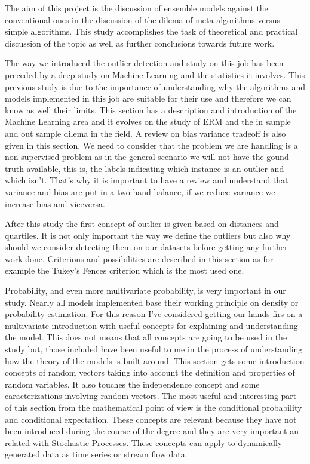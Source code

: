 The aim of this project is the discussion of ensemble models against the conventional ones in the discussion of the dilema of meta-algorithms versus simple algorithms. This study accomplishes the task of theoretical and practical discussion of the topic as well as further conclusions towards future work.

The way we introduced the outlier detection and study on this job has been preceded by a deep study on Machine Learning and the statistics it involves. This previous study is due to the importance of understanding why the algorithms and models implemented in this job are suitable for their use and therefore we can know as well their limits. This section has a description and introduction of the Machine Learning area and it evolves on the study of ERM and the in sample and out sample dilema in the field. A review on bias variance tradeoff is also given in this section. We need to consider that the problem we are handling is a non-supervised problem as in the general scenario we will not have the gound truth available, this is, the labels indicating which instance is an outlier and which isn't. That's why it is important to have a review and understand that variance and bias are put in a two hand balance, if we reduce variance we increase bias and viceversa.

After this study the first concept of outlier is given based on distances and quartiles. It is not only important the way we define the outliers but also why should we consider detecting them on our datasets before getting any further work done. Criterions and possibilities are described in this section as for example the Tukey's Fences criterion which is the most used one.

Probability, and even more multivariate probability, is very important in our study. Nearly all models implemented base their working principle on density or probability estimation. For this reason I've considered getting our hands firs on a multivariate introduction with useful concepts for explaining and understanding the model. This does not means that all concepts are going to be used in the study but, those included have been useful to me in the process of understanding how the theory of the models is built around. This section gets some introduction concepts of random vectors taking into account the definition and properties of random variables. It also touches the independence concept and some caracterizations involving random vectors. The most useful and interesting part of this section from the mathematical point of view is the conditional probability and conditional expectation. These concepts are relevant because they have not been introduced during the course of the degree and they are very important an related with Stochastic Processes. These concepts can apply to dynamically generated data as time series or stream flow data.


